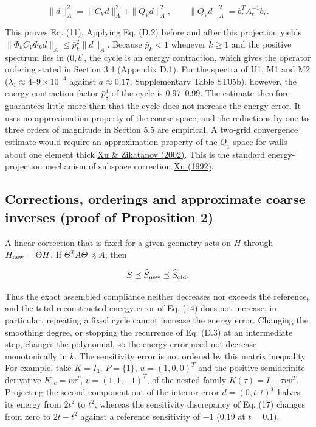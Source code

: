 \documentclass[preprint,12pt,authoryear]{elsarticle}
\begin{document}
\[
\|d\|_A^2=\|C_Vd\|_A^2+\|Q_Vd\|_A^2,
\qquad\|Q_Vd\|_A^2=b_r^TA_c^{-1}b_r.
\tag{D.5}
\]

This proves Eq. (11). Applying Eq. (D.2) before and after this projection yields \(\|\Phi_kC_V\Phi_kd\|_A\le\bar p_k^2\|d\|_A\). Because \(\bar p_k<1\) whenever \(k\ge1\) and the positive spectrum lies in \((0,b]\), the cycle is an energy contraction, which gives the operator ordering stated in Section 3.4 (Appendix D.1). For the spectra of U1, M1 and M2 (\(\lambda_1\approx4\)--\(9\times10^{-4}\) against \(a\approx0.17\); Supplementary Table ST05b), however, the energy contraction factor \(\bar p_8^4\) of the cycle is 0.97--0.99. The estimate therefore guarantees little more than that the cycle does not increase the energy error. It uses no approximation property of the coarse space, and the reductions by one to three orders of magnitude in Section 5.5 are empirical. A two-grid convergence estimate would require an approximation property of the \(Q_1\) space for walls about one element thick \href{https://doi.org/10.1090/S0894-0347-02-00398-3}{Xu \& Zikatanov (2002)}. This is the standard energy-projection mechanism of subspace correction \href{https://doi.org/10.1137/1034116}{Xu (1992)}.

\subsection{Corrections, orderings and approximate coarse inverses (proof of Proposition 2)}

A linear correction that is fixed for a given geometry acts on \(H\) through \(H_{\rm new}=\Theta H\). If \(\Theta^TA\Theta\preceq A\), then

\[
S\preceq\widehat S_{\rm new}\preceq\widehat S_{\rm old}.
\]

Thus the exact assembled compliance neither decreases nor exceeds the reference, and the total reconstructed energy error of Eq. (14) does not increase; in particular, repeating a fixed cycle cannot increase the energy error. Changing the smoothing degree, or stopping the recurrence of Eq. (D.3) at an intermediate step, changes the polynomial, so the energy error need not decrease monotonically in \(k\). The sensitivity error is not ordered by this matrix inequality. For example, take \(K=I_3\), \(P=\{1\}\), \(u=(1,0,0)^T\) and the positive semidefinite derivative \(K_{,c}=vv^T\), \(v=(1,1,-1)^T\), of the nested family \(K(\tau)=I+\tau vv^T\). Projecting the second component out of the interior error \(d=(0,t,t)^T\) halves its energy from \(2t^2\) to \(t^2\), whereas the sensitivity discrepancy of Eq. (17) changes from zero to \(2t-t^2\) against a reference sensitivity of \(-1\) (0.19 at \(t=0.1\)).
\end{document}

